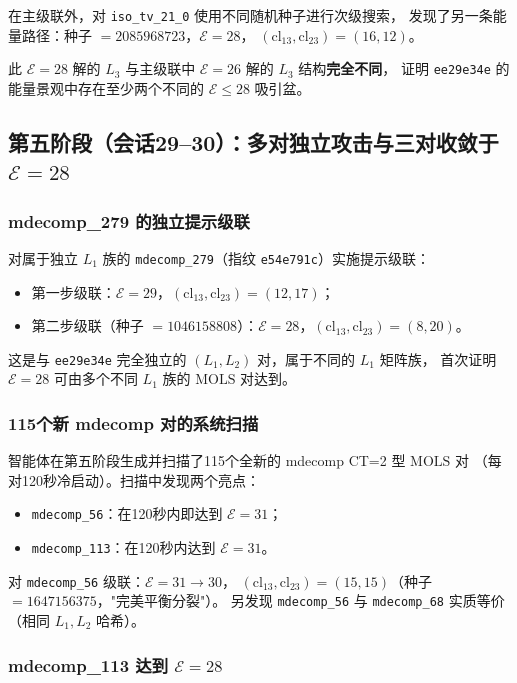 \documentclass[11pt,a4paper]{ctexart}
\theoremstyle{remark}
\newcommand{\cl}{\mathrm{cl}}
\newcommand{\E}{\mathcal{E}}
\newcommand{\MOLS}{\mathrm{MOLS}}
\begin{document}
在主级联外，对 \texttt{iso\_tv\_21\_0} 使用不同随机种子进行次级搜索，
发现了另一条能量路径：种子 $= 2085968723$，$\E = 28$，
$(\cl_{13}, \cl_{23}) = (16, 12)$。

此 $\E = 28$ 解的 $L_3$ 与主级联中 $\E = 26$ 解的 $L_3$ 结构\textbf{完全不同}，
证明 \texttt{ee29e34e} 的能量景观中存在至少两个不同的 $\E \le 28$ 吸引盆。

\subsection{第五阶段（会话29--30）：多对独立攻击与三对收敛于 $\E = 28$}

\subsubsection{mdecomp\_279 的独立提示级联}

对属于独立 $L_1$ 族的 \texttt{mdecomp\_279}（指纹 \texttt{e54e791c}）实施提示级联：
\begin{itemize}[leftmargin=2em]
  \item 第一步级联：$\E = 29$，$(\cl_{13}, \cl_{23}) = (12, 17)$；
  \item 第二步级联（种子 $= 1046158808$）：$\E = 28$，$(\cl_{13}, \cl_{23}) = (8, 20)$。
\end{itemize}

这是与 \texttt{ee29e34e} 完全独立的 $(L_1, L_2)$ 对，属于不同的 $L_1$ 矩阵族，
首次证明 $\E = 28$ 可由多个不同 $L_1$ 族的 $\MOLS$ 对达到。

\subsubsection{115个新 mdecomp 对的系统扫描}

智能体在第五阶段生成并扫描了115个全新的 mdecomp CT=2 型 $\MOLS$ 对
（每对120秒冷启动）。扫描中发现两个亮点：

\begin{itemize}[leftmargin=2em]
  \item \texttt{mdecomp\_56}：在120秒内即达到 $\E = 31$；
  \item \texttt{mdecomp\_113}：在120秒内达到 $\E = 31$。
\end{itemize}

对 \texttt{mdecomp\_56} 级联：$\E = 31 \to 30$，
$(\cl_{13}, \cl_{23}) = (15, 15)$（种子 $= 1647156375$，"完美平衡分裂"）。
另发现 \texttt{mdecomp\_56} 与 \texttt{mdecomp\_68} 实质等价（相同 $L_1, L_2$ 哈希）。

\subsubsection{mdecomp\_113 达到 $\E = 28$}
\end{document}
